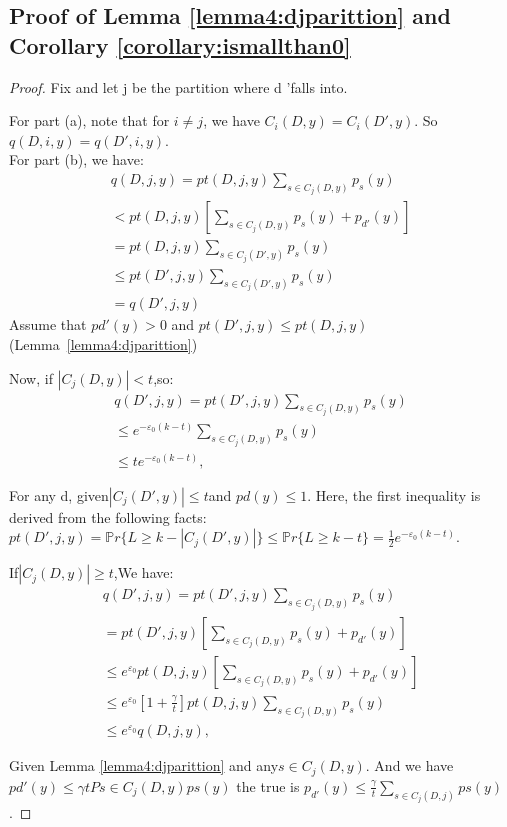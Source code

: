 \subsection{Proof of Lemma \ref{lemma4:djparittion} and Corollary \ref{corollary:ismallthan0}}


\begin{proof}
	Fix and let j be the partition where d 'falls into.

    For part (a), note that for $ i \neq j $, we have $ C_i (D, y) = C_i (D ', y) $. So $ q (D, i, y) = q (D ', i, y) $.\\
    For part (b), we have:
			\begin{equation}
	\begin{aligned}
	q(D, j, y) = pt(D, j, y) \sum_{s\in C_j(D,y)} 	p_s(y)  \\
	< pt(D, j, y) [ \sum_{s\in C_j(D,y)} p_s(y) + p_{d'}(y)  ] \\
	= pt(D, j, y) \sum_{s\in C_j(D',y)} p_s(y) \\
	\leq  pt(D', j, y) \sum_{s\in C_j(D',y)} p_s(y) \\
	= q(D', j, y)   
		\end{aligned}
	\end{equation}
Assume that $pd'(y)> 0$ and $pt(D',j,y)\leq pt(D,j,y)$(Lemma~\ref{lemma4:djparittion})	
	
Now, if $| C_j(D,y)| <t$,so:
			\begin{equation}
\begin{aligned}
q(D', j, y) = pt(D', j, y) \sum_{s\in C_j(D,y)} 	p_s(y)  \\
\leq e^{-\varepsilon_0(k-t)}\sum_{s\in C_j(D,y)} 	p_s(y) \\
\leq t e^{-\varepsilon_0(k-t)} ,  
\end{aligned}
\end{equation}

For any d, given$| C_j(D',y)|\leq t $and $pd(y)\leq1$. Here, the first inequality is derived from the following facts:$pt(D',j,y)= \mathbb{P}r \{L\geq k-| C_j(D',y)|\}\leq \mathbb{P}r\{L \geq k-t\} = \frac{1}{2} e^{-\varepsilon_0(k-t)}$.

If$| C_j(D,y)| \geq t$,We have:
			\begin{equation}
\begin{aligned}
q(D', j, y) = pt(D', j, y) \sum_{s\in C_j(D,y)} 	p_s(y)  \\
=  pt(D', j, y) [\sum_{s\in C_j(D,y)} 	p_s(y) +p_{d'}(y)]  \\
\leq e^{\varepsilon_0}pt(D, j, y) [\sum_{s\in C_j(D,y)} 	p_s(y) +p_{d'}(y)]  \\ 
\leq e^{\varepsilon_0} [ 1+\frac{\gamma}{t}]pt(D, j, y) \sum_{s\in C_j(D,y)} 	p_s(y)   \\ 
\leq e^{\varepsilon_0} q(D, j, y),
\end{aligned}
\end{equation}

Given Lemma \ref{lemma4:djparittion} and any$s\in C_j(D,y)$. And we have $pd'(y)\leq \gamma t Ps\in C_j(D,y)ps(y)$ the true is $p_{d'}(y)\leq \frac{\gamma}{t} \sum_{s\in C_j (D,j)} ps(y)$.
\end{proof}

